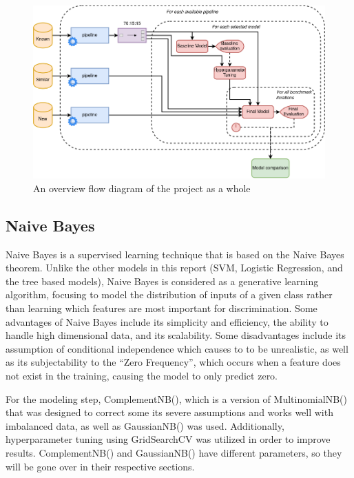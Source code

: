 \begin{figure}
    \centering
    \includegraphics[width=\linewidth]{figures/uploads/project_arch.png}
    \caption{An overview flow diagram of the project as a whole}
    \label{fig:project-arch}
\end{figure}

\subsection{Naive Bayes}
Naive Bayes is a supervised learning technique that is based on the Naive Bayes theorem. Unlike the other models in this report (SVM, Logistic Regression, and the tree based models), Naive Bayes is considered as a generative learning algorithm, focusing to model the distribution of inputs of a given class rather than learning which features are most important for discrimination. Some advantages of Naive Bayes include its simplicity and efficiency, the ability to handle high dimensional data, and its scalability. Some disadvantages include its assumption of conditional independence which causes to to be unrealistic, as well as its subjectability to the ``Zero Frequency'', which occurs when a feature does not exist in the training, causing the model to only predict zero.

For the modeling step, ComplementNB(), which is a version of MultinomialNB() that was designed to correct some its severe assumptions and works well with imbalanced data, as well as GaussianNB() was used. Additionally, hyperparameter tuning using GridSearchCV was utilized in order to improve results. ComplementNB() and GaussianNB() have different parameters, so they will be gone over in their respective sections.

